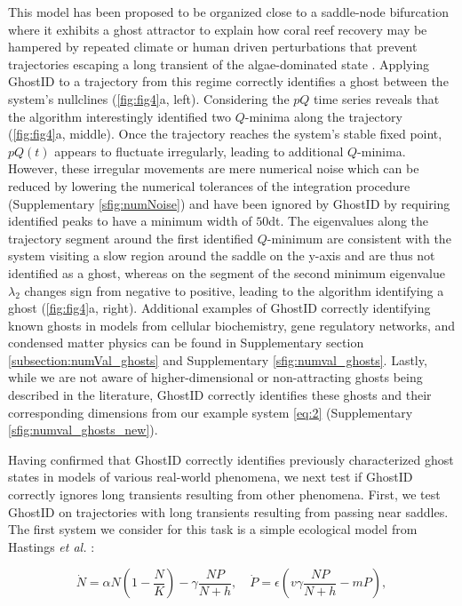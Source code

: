 \documentclass{article}
\theoremstyle{definition}
\begin{document}
\begin{refsection}
This model has been proposed to be organized close to a saddle-node bifurcation where it exhibits a ghost attractor to explain how coral reef recovery may be hampered by repeated climate or human driven perturbations that prevent trajectories escaping a long transient of the algae-dominated state \cite{Bieg_2024}. Applying GhostID to a trajectory from this regime correctly identifies a ghost between the system's nullclines (\autoref{fig:fig4}a, left). Considering the $pQ$ time series reveals that the algorithm interestingly identified two $Q$-minima along the trajectory (\autoref{fig:fig4}a, middle). Once the trajectory reaches the system's stable fixed point, $pQ(t)$ appears to fluctuate irregularly, leading to additional $Q$-minima. However, these irregular movements are mere numerical noise which can be reduced by lowering the numerical tolerances of the integration procedure (Supplementary \autoref{sfig:numNoise}) and have been ignored by GhostID by requiring identified peaks to have a minimum width of $50$dt. The eigenvalues along the trajectory segment around the first identified $Q$-minimum are consistent with the system visiting a slow region around the saddle on the y-axis and are thus not identified as a ghost, whereas on the segment of the second minimum eigenvalue $\lambda_2$ changes sign from negative to positive, leading to the algorithm identifying a ghost (\autoref{fig:fig4}a, right). Additional examples of GhostID correctly identifying known ghosts in models from cellular biochemistry, gene regulatory networks, and condensed matter physics can be found in Supplementary section \ref{subsection:numVal_ghosts} and Supplementary \autoref{sfig:numval_ghosts}. Lastly, while we are not aware of higher-dimensional or non-attracting ghosts being described in the literature, GhostID correctly identifies these ghosts and their corresponding dimensions from our example system \ref{eq:2} (Supplementary \autoref{sfig:numval_ghosts_new}).

Having confirmed that GhostID correctly identifies previously characterized ghost states in models of various real-world phenomena, we next test if GhostID correctly ignores long transients resulting from other phenomena. First, we test GhostID on trajectories with long transients resulting from passing near saddles. The first system we consider for this task is a simple ecological model from Hastings \textit{et al.} \cite{Hastings_2018}:

\begin{equation}
    \dot{N} = \alpha N \left(1 - \frac{N}{K}\right) - \gamma \frac{N P}{N + h} \label{eq:Hastings}, \quad
    \dot{P} = \epsilon \left( v \gamma \frac{N P}{N + h} - m P \right), 
\end{equation}


\end{refsection}
\end{document}
